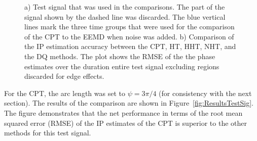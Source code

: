 \documentclass[a4paper]{IEEEtran}
\begin{document}
\begin{figure}[ht]
	\centering
	\caption{a) Test signal that was used in the comparisons. The part of the signal shown by the dashed line was discarded. The blue vertical lines mark the three time groups that were used for the comparison of the CPT to the EEMD when noise was added. b) Comparison of the IP estimation accuracy between the CPT, HT, HHT, NHT, and the DQ methods. The plot shows the RMSE of the the phase estimates over the duration entire test signal excluding regions discarded for edge effects.}
\end{figure}

For the CPT, the arc length was set to $\psi=3\pi/4$ (for consistency with the next section). The results of the comparison are shown in Figure~\ref{fig:ResultsTestSig}. The figure demonstrates that the net performance in terms of the root mean squared error (RMSE) of the IP estimates of the CPT is superior to the other methods for this test signal.
\end{document}
